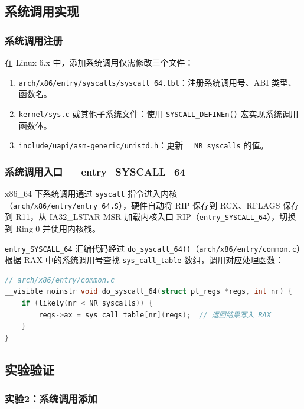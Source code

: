 \documentclass[a4paper]{article}
\begin{document}
\subsection{系统调用实现}

\subsubsection{系统调用注册}

在 Linux 6.x 中，添加系统调用仅需修改三个文件\cite{love}：

\begin{enumerate}[leftmargin=*]
    \item \texttt{arch/x86/entry/syscalls/syscall\_64.tbl}：注册系统调用号、ABI 类型、函数名。
    \item \texttt{kernel/sys.c} 或其他子系统文件：使用 \texttt{SYSCALL\_DEFINEn()} 宏实现系统调用函数体。
    \item \texttt{include/uapi/asm-generic/unistd.h}：更新 \texttt{\_\_NR\_syscalls} 的值。
\end{enumerate}

\subsubsection{系统调用入口 — entry\_SYSCALL\_64}

x86\_64 下系统调用通过 \texttt{syscall} 指令进入内核（\texttt{arch/x86/entry/entry\_64.S}）\cite{intel_sdm}，硬件自动将 RIP 保存到 RCX、RFLAGS 保存到 R11，从 IA32\_LSTAR MSR 加载内核入口 RIP（\texttt{entry\_SYSCALL\_64}），切换到 Ring 0 并使用内核栈。

\texttt{entry\_SYSCALL\_64} 汇编代码经过 \texttt{do\_syscall\_64()}（\texttt{arch/x86/entry/common.c}）根据 RAX 中的系统调用号查找 \texttt{sys\_call\_table} 数组，调用对应处理函数：

\begin{lstlisting}[language=C, caption={do\_syscall\_64 — 系统调用分发}, label={lst:do_syscall}]
// arch/x86/entry/common.c
__visible noinstr void do_syscall_64(struct pt_regs *regs, int nr) {
    if (likely(nr < NR_syscalls)) {
        regs->ax = sys_call_table[nr](regs);  // 返回结果写入 RAX
    }
}
\end{lstlisting}

\subsection{实验验证}

\subsubsection{实验2：系统调用添加}
\end{document}

